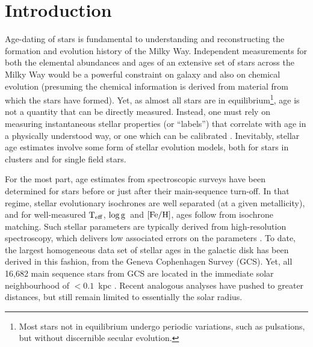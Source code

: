 \documentclass[12pt, preprint]{aastex}
\newcommand{\teff}{\mbox{$\rm T_{eff}$}}
\newcommand{\feh}{\mbox{$\rm [Fe/H]$}}
\newcommand{\logg}{\mbox{$\rm \log g$}}
\begin{document}

\section{Introduction}\label{sec:Intro}

Age-dating of stars is fundamental to understanding and reconstructing the formation and evolution history of the Milky Way. Independent measurements for both the elemental abundances and ages of an extensive set of stars across the Milky Way would be a powerful constraint on galaxy and also on chemical evolution (presuming the chemical information is derived from material from which the stars have formed).
Yet, as almost all stars are in equilibrium\footnote{Most stars not in equilibrium undergo periodic variations, such as pulsations, but without discernible secular evolution.}, age is not a quantity that can be directly measured. Instead, one must rely on measuring instantaneous stellar properties (or ``labels'') that correlate with age in a physically understood way, or one which can be calibrated \citep[see][for an excellent review]{soderblom2010}.
Inevitably, stellar age estimates involve some form of stellar evolution models, both for stars in clusters and for single field stars. 

For the most part, age estimates from spectroscopic surveys have been determined for stars before or just after their main-sequence turn-off. 
In that regime, stellar evolutionary isochrones are well separated (at a given metallicity), and for well-measured \teff, \logg\ and \feh, ages follow from isochrone matching. 
Such stellar parameters are typically derived from high-resolution spectroscopy, which delivers low associated errors on the parameters \citep[e.g.][]{Bensby2013, Casagrande2011, haywood2013, B2014}.  To date, the largest homogeneous data set of stellar ages in the galactic disk has been derived in this fashion, from the Geneva Cophenhagen Survey (GCS). Yet, all 16,682 main sequence stars from GCS are located in the immediate solar neighbourhood of $<0.1$~kpc \citep{nordstrom2004short}.
Recent analogous analyses \citep[e.g.][]{haywood2013, B2014} have pushed to greater distances, but still remain limited to essentially the solar radius.
\end{document}
